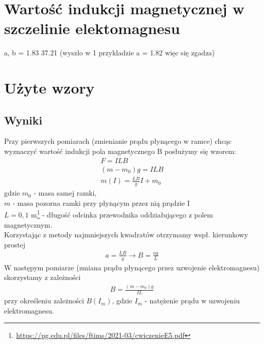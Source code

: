 \documentclass{article}
\begin{document}
\section{Wartość indukcji magnetycznej w szczelinie elektomagnesu}

a, b = 1.83 37.21
(wyszlo w 1 przykladzie a = 1.82 więc się zgadza)

\section{Użyte wzory}

\subsection{Wyniki}
Przy pierwszych pomiarach (zmienianie prądu płynącego w ramce) chcąc wyznaczyć 
wartość indukcji pola magnetycznego B posłużymy się wzorem:
\begin{gather*}
	F = ILB \\
	(m-m_0)g = ILB \\
	m(I) = \frac{LB}{g}I + m_0
\end{gather*} 
gdzie $m_0$ - masa samej ramki,\\
$m$ - masa pozorna ramki przy płynącym przez nią prądzie I \\
$L=0,1$ m\footnote{\url{https://pg.edu.pl/files/ftims/2021-03/cwiczenieE5.pdf}} - długość odcinka przewodnika oddziałującego z polem magnetycznym. \\
Korzystając z metody najmniejszych kwadratów otrzymamy wspł.  kierunkowy prostej
\begin{gather*}
	a = \frac{LB}{g} \rightarrow B = \frac{ag}{L}
\end{gather*}
W następym pomiarze (zmiana prądu płynącego przez uzwojenie elektromagnesu) skorzystamy z zależności
\begin{gather*}
	B = \frac{(m-m_0)g}{IL}
\end{gather*}
przy określeniu zależności $B(I_m)$, gdzie $I_m$ - natężenie prądu w uzwojeniu elektromagnesu.
\end{document}
